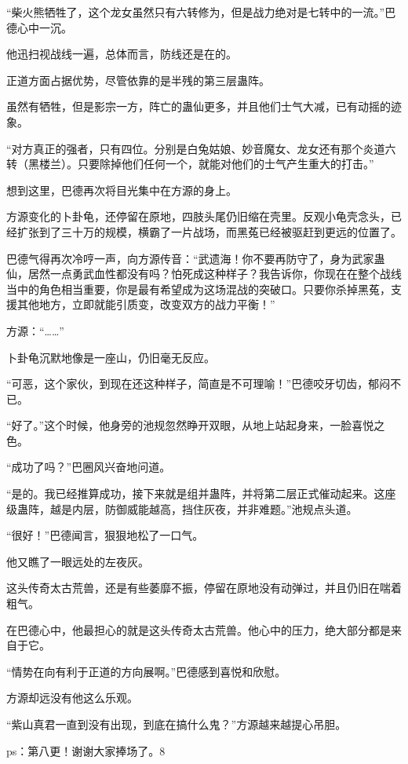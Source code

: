 \begin{this_body}
“柴火熊牺牲了，这个龙女虽然只有六转修为，但是战力绝对是七转中的一流。”巴德心中一沉。

他迅扫视战线一遍，总体而言，防线还是在的。

正道方面占据优势，尽管依靠的是半残的第三层蛊阵。

虽然有牺牲，但是影宗一方，阵亡的蛊仙更多，并且他们士气大减，已有动摇的迹象。

“对方真正的强者，只有四位。分别是白兔姑娘、妙音魔女、龙女还有那个炎道六转（黑楼兰）。只要除掉他们任何一个，就能对他们的士气产生重大的打击。”

想到这里，巴德再次将目光集中在方源的身上。

方源变化的卜卦龟，还停留在原地，四肢头尾仍旧缩在壳里。反观小龟壳念头，已经扩张到了三十万的规模，横霸了一片战场，而黑菟已经被驱赶到更远的位置了。

巴德气得再次冷哼一声，向方源传音：“武遗海！你不要再防守了，身为武家蛊仙，居然一点勇武血性都没有吗？怕死成这种样子？我告诉你，你现在在整个战线当中的角色相当重要，你是最有希望成为这场混战的突破口。只要你杀掉黑菟，支援其他地方，立即就能引质变，改变双方的战力平衡！”

方源：“……”

卜卦龟沉默地像是一座山，仍旧毫无反应。

“可恶，这个家伙，到现在还这种样子，简直是不可理喻！”巴德咬牙切齿，郁闷不已。

“好了。”这个时候，他身旁的池规忽然睁开双眼，从地上站起身来，一脸喜悦之色。

“成功了吗？”巴圈风兴奋地问道。

“是的。我已经推算成功，接下来就是组并蛊阵，并将第二层正式催动起来。这座级蛊阵，越是内层，防御威能越高，挡住灰夜，并非难题。”池规点头道。

“很好！”巴德闻言，狠狠地松了一口气。

他又瞧了一眼远处的左夜灰。

这头传奇太古荒兽，还是有些萎靡不振，停留在原地没有动弹过，并且仍旧在喘着粗气。

在巴德心中，他最担心的就是这头传奇太古荒兽。他心中的压力，绝大部分都是来自于它。

“情势在向有利于正道的方向展啊。”巴德感到喜悦和欣慰。

方源却远没有他这么乐观。

“紫山真君一直到没有出现，到底在搞什么鬼？”方源越来越提心吊胆。

ps：第八更！谢谢大家捧场了。8

\end{this_body}

